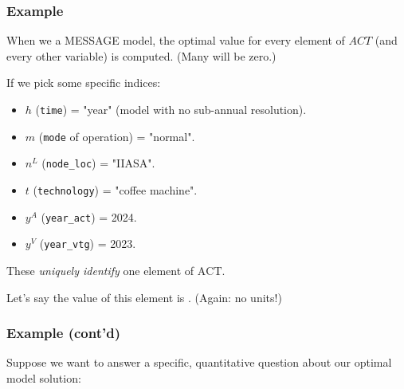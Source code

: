 \documentclass[12pt,aspectratio=169]{beamer}
\begin{document}
\begin{frame}
\frametitle{Example}

When we  a MESSAGE model, the optimal value for every element of $ACT$ (and every other variable) is computed.
(Many will be zero.)

\medskip
If we pick some specific indices:
\begin{itemize}
  \item $h$ (\texttt{time}) = "year" (model with no sub-annual resolution).
  \item $m$ (\texttt{mode} of operation) = "normal".
  \item $n^L$ (\texttt{node\_loc}) = "IIASA".
  \item $t$ (\texttt{technology}) = "coffee machine".
  \item $y^A$ (\texttt{year\_act}) = 2024.
  \item $y^V$ (\texttt{year\_vtg}) = 2023.
\end{itemize}

\medskip
These \emph{uniquely identify} one element of $\text{ACT}$.

Let's say the value of this element is . (Again: no units!)
\end{frame}

\begin{frame}
\frametitle{Example (cont'd)}

Suppose we want to answer a specific, quantitative question about our optimal model solution:

\bigskip
{\Huge {}}

\end{frame}
\end{document}
